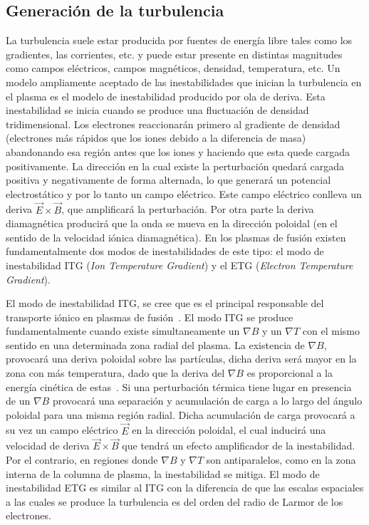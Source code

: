 \subsection{Generación de la turbulencia}\label{subsec:turbgen}
La turbulencia suele estar producida por fuentes de energía libre tales como los gradientes,
las corrientes, etc. y puede estar presente en distintas magnitudes como campos eléctricos,
campos magnéticos, densidad, temperatura, etc. 
Un modelo ampliamente aceptado de las inestabilidades que inician la turbulencia en el
plasma es el modelo de inestabilidad producido por ola de deriva. Esta inestabilidad se inicia 
cuando se produce
una fluctuación de densidad tridimensional. Los electrones
reaccionarán primero al gradiente de densidad (electrones más rápidos que los iones debido
a la diferencia de masa) abandonando esa región antes que los iones y haciendo que esta
quede cargada positivamente. La dirección en la cual existe la perturbación quedará cargada
positiva y negativamente de forma alternada, lo que generará un potencial electrostático y
por lo tanto un campo eléctrico. Este campo
eléctrico conlleva un deriva $\vec{E}\times\vec{B}$, 
que amplificará la perturbación. Por otra parte la deriva
diamagnética producirá que la onda se mueva en la dirección poloidal (en el sentido de la
velocidad iónica diamagnética). 
En los plasmas de fusión existen fundamentalmente
dos modos de inestabilidades de este tipo: el modo de inestabilidad ITG (\textit{Ion Temperature
Gradient}) y el ETG (\textit{Electron Temperature Gradient}).\par
El modo de inestabilidad ITG, se cree que es el principal responsable del transporte iónico
en plasmas de fusión~\cite{Hamaguchi_1992,doi:10.1063/1.859860}. El modo ITG se produce fundamentalmente 
cuando existe
simultaneamente un $\nabla B$ y un $\nabla T$ con el mismo sentido en una determinada zona radial del
plasma. La existencia de $\nabla B$,
provocará una deriva poloidal sobre las partículas, dicha deriva será mayor en la zona con más
temperatura, dado que la deriva del $\nabla B$ es proporcional a la energía cinética de estas~\cite{goldston1995introduction}.
Si una perturbación térmica tiene lugar en presencia de un $\nabla B$ provocará una separación
y acumulación de carga a lo largo del ángulo poloidal para una misma región radial. 
Dicha acumulación de carga provocará a su vez un campo
eléctrico $\vec{E}$
en la dirección poloidal, el cual inducirá una velocidad de deriva $\vec{E}\times\vec{B}$ 
que tendrá un efecto amplificador de la inestabilidad.
Por el contrario, en regiones donde $\nabla B$ y $\nabla T$ son antiparalelos, como en la zona interna de
la columna de plasma, la inestabilidad se mitiga.
El modo de inestabilidad ETG es similar al ITG con la diferencia de que las escalas espaciales
a las cuales se produce la turbulencia es del orden del radio de Larmor de los electrones.
